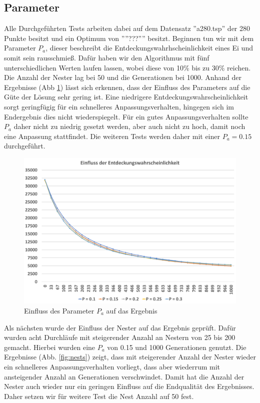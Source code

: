 \documentclass[conference]{IEEEtran}
\begin{document}
    \subsection{Parameter}
      Alle Durchgeführten Tests arbeiten dabei auf dem Datensatz ''a280.tsp'' der 280 Punkte besitzt und ein Optimum von ''''???'''' besitzt. 
      Beginnen tun wir mit dem Parameter $P_a$, dieser beschreibt die Entdeckungswahrhscheinlichkeit eines Ei und somit sein rausschmieß. 
      Dafür haben wir den Algorithmus mit fünf unterschiedlichen Werten laufen lassen, wobei diese von 10\% bis zu 30\% reichen. Die Anzahl der Nester lag bei
      50 und die Generationen bei 1000. 
      Anhand der Ergebnisse (Abb \ref{fig:pa}) lässt sich erkennen, dass der Einfluss des Parameters auf die Güte der Lösung sehr gering ist. Eine 
      niedrigere Entdeckungswahrscheinlichkeit sorgt geringfügig für ein schnelleres Anpassungsverhalten, hingegen sich im Endergebnis dies 
      nicht wiederspiegelt. 
      Für ein gutes Anpassungsverhalten sollte $P_a$ daher nicht zu niedrig gesetzt werden, aber auch nicht zu hoch, damit noch eine Anpassung stattfindet. 
      Die weiteren Tests werden daher mit einer $P_a = 0.15$ durchgeführt. 
      \begin{figure}[H]
        \centering
        \includegraphics[width=0.8\linewidth]{Entdeckungswahrscheinlichkeit.png}
        \caption{Einfluss des Parameter $P_a$ auf das Ergebnis}
        \label{fig:pa}
      \end{figure}

      Als nächsten wurde der Einfluss der Nester auf das Ergebnis geprüft. Dafür wurden acht Durchläufe mit steigerender Anzahl an Nestern von 25 bis 200 
      gemacht. Hierbei wurden eine $P_a$ von 0.15 und 1000 Generationen genutzt. Die Ergebnisse (Abb. \ref{fig:nests}) zeigt, dass mit steigerender Anzahl der Nester wieder
      ein schnelleres Anpassungsverhalten vorliegt, dass aber wiederrum mit ansteigender Anzahl an Generationen verschwindet. Damit hat die Anzahl der Nester auch wieder
      nur ein geringen Einfluss auf die Endqualität des Ergebnisses. Daher setzen wir für weitere Test die Nest Anzahl auf 50 fest. 
\end{document}
